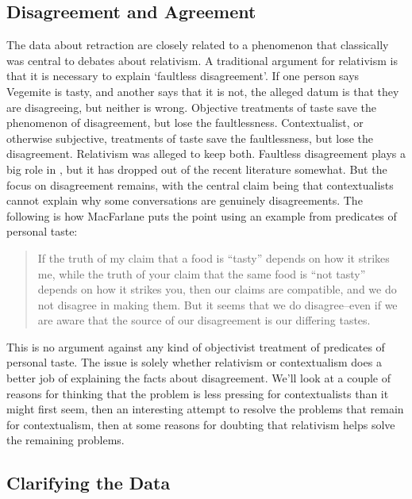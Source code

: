 \subsection{Disagreement and Agreement}
\label{disagreementandagreement}

The data about retraction are closely related to a phenomenon that classically was central to debates about relativism. A traditional argument for relativism is that it is necessary to explain `faultless disagreement'. If one person says Vegemite is tasty, and another says that it is not, the alleged datum is that they are disagreeing, but neither is wrong. Objective treatments of taste save the phenomenon of disagreement, but lose the faultlessness. Contextualist, or otherwise subjective, treatments of taste save the faultlessness, but lose the disagreement. Relativism was alleged to keep both. Faultless disagreement plays a big role in  \citet{Kolbel2002}, but it has dropped out of the recent literature somewhat. But the focus on disagreement remains, with the central claim being that contextualists cannot explain why some conversations are genuinely disagreements. The following is how MacFarlane puts the point using an example from predicates of personal taste:

\begin{quote}

If the truth of my claim that a food is ``tasty'' depends on how it strikes me, while the truth of your claim that the same food is ``not tasty'' depends on how it strikes you, then our claims are compatible, and we do not disagree in making them. But it seems that we do disagree--even if we are aware that the source of our disagreement is our differing tastes. ~\citep[8]{MacFarlane2014}
\end{quote}
This is no argument against any kind of objectivist treatment of predicates of personal taste. The issue is solely whether relativism or contextualism does a better job of explaining the facts about disagreement. We'll look at a couple of reasons for thinking that the problem is less pressing for contextualists than it might first seem, then an interesting attempt to resolve the problems that remain for contextualism, then at some reasons for doubting that relativism helps solve the remaining problems.

\subsection{Clarifying the Data}
\label{clarifyingthedata}

